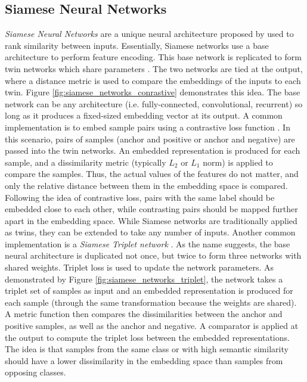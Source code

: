 		\subsection{Siamese Neural Networks}
		\textit{Siamese Neural Networks} are a unique neural architecture proposed by \cite{Bromley1993SiameseNetworks} used to rank similarity between inputs.  Essentially, Siamese networks use a base architecture to perform feature encoding.  This base network is replicated to form twin networks which share parameters \citep{Koch2015SiameseNetworks,Koch2015SiameseNetworksThesis}. The two networks are tied at the output, where a distance metric is used to compare the embeddings of the inputs to each twin.  Figure \ref{fig:siamese_networks_conrastive} demonstrates this idea.  The base network can be any architecture (i.e. fully-connected, convolutional, recurrent) so  long as it produces a fixed-sized embedding vector at its output.  A common implementation is to embed sample pairs using a contrastive loss function \citep{Koch2015SiameseNetworks}.  In this scenario, pairs of samples (anchor and positive or anchor and negative) are passed into the twin networks.  An embedded representation is produced for each sample, and a dissimilarity metric (typically $L_{2}$ or $L_{1}$ norm) is applied to compare the samples.  Thus, the actual values of the features do not matter, and only the relative distance between them in the embedding space is compared.  Following the idea of contrastive loss, pairs with the same label should be embedded close to each other, while contrasting pairs should be mapped further apart in the embedding space.  While Siamese networks are traditionally applied as twins, they can be extended to take any number of inputs.  Another common implementation is a \textit{Siamese Triplet network} \citep{Hoffer2015DeepMetricLearning}.  As the name suggests, the base neural architecture is duplicated not once, but twice to form three networks with shared weights.  Triplet loss is used to update the network parameters.  As demonstrated by Figure \ref{fig:siamese_networks_triplet}, the network takes a triplet set of samples as input and an embedded representation is produced for each sample (through the same transformation because the weights are shared).  A metric function then compares the dissimilarities between the anchor and positive samples, as well as the anchor and negative.  A comparator is applied at the output to compute the triplet loss between the embedded representations.  The idea is that samples from the same class or with high semantic similarity should have a lower dissimilarity in the embedding space than samples  from opposing classes.
		

